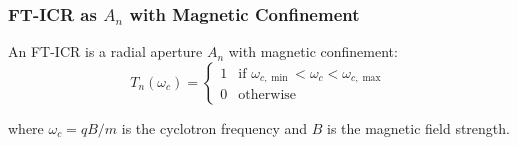 \subsubsection{FT-ICR as $A_n$ with Magnetic Confinement}

\begin{theorem}
\label{thm:fticr_magnetic}
An FT-ICR is a radial aperture $A_n$ with magnetic confinement:
\begin{equation}
T_n(\omega_c) = \begin{cases}
1 & \text{if } \omega_{c,\min} < \omega_c < \omega_{c,\max} \\
0 & \text{otherwise}
\end{cases}
\end{equation}

where $\omega_c = qB/m$ is the cyclotron frequency and $B$ is the magnetic field strength.
\end{theorem}

